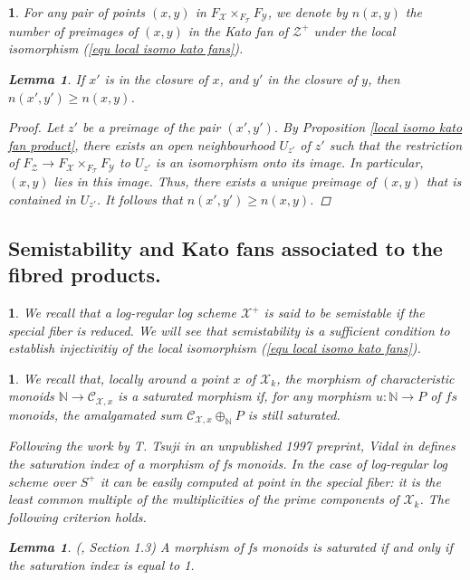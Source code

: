 \documentclass{amsart}%
\numberwithin{equation}{subsection}
\theoremstyle{plain2}
\newtheorem{lemma}[equation]{Lemma}
\theoremstyle{definition2}
\theoremstyle{stepstyle}
\theoremstyle{point}
\theoremstyle{subpoint}
\newtheorem{subpoint}[equation]{}%
\newcommand{\spa}[1]{\begin{subpoint}#1\end{subpoint}}           %
\newcommand{\N}{\ensuremath{\mathbb{N}}}
\newcommand{\cX}{\ensuremath{\mathscr{X}}}
\newcommand{\caC}{\ensuremath{\mathcal{C}}}
\newcommand{\cY}{\ensuremath{\mathscr{Y}}}
\newcommand{\cZ}{\ensuremath{\mathscr{Z}}}
\renewcommand{\cY}{\ensuremath{\mathscr{Y}}}
\begin{document}
\spa{For any pair of points $(x,y)$ in $F_\cX \times_{F_{\mathscr{T}}} F_\cY$, we denote by $n(x,y)$ the number of preimages of $(x,y)$ in the Kato fan of $\cZ^+$ under the local isomorphism (\ref{equ local isomo kato fans}).
\begin{lemma} \label{lemma number of preimages} If $x'$ is in the closure of $x$, and $y'$ in the closure of $y$, then $n(x',y')\geqslant n(x,y)$.
\end{lemma}
\begin{proof}
Let $z'$ be a preimage of the pair $(x',y')$. By Proposition \ref{local isomo kato fan product}, there exists an open neighbourhood $U_{z'}$ of $z'$ such that the restriction of $F_{\cZ} \rightarrow F_{\cX} \times_{F_\mathscr{T}} F_{\cY}$ to $U_{z'}$ is an isomorphism onto its image. In particular, $(x,y)$ lies in this image. Thus, there exists a unique preimage of $(x,y)$ that is contained in $U_{z'}$. It follows that $n(x',y')\geqslant n(x,y)$.
\end{proof}
}

\subsection{Semistability and Kato fans associated to the fibred products.} 
\spa{We recall that a log-regular log scheme $\cX^+$ is said to be semistable if the special fiber is reduced. We will see that semistability is a sufficient condition to establish injectivitiy of the local isomorphism (\ref{equ local isomo kato fans}). }

\spa{We recall that, locally around a point $x$ of $\cX_k$, the morphism of characteristic monoids $\N \rightarrow \caC_{\cX,x}$ is a saturated morphism if, for any morphism $u: \N \rightarrow P$ of $fs$ monoids, the amalgamated sum $\caC_{\cX,x} \oplus_{\N} P$ is still saturated.

Following the work by T. Tsuji in an unpublished 1997 preprint, Vidal in \cite{Vidal} defines the saturation index of a morphism of \emph{fs} monoids. In the case of log-regular log scheme over $S^+$ it can be easily computed at point in the special fiber: it is the least common multiple of the multiplicities of the prime components of $\cX_k$. The following criterion holds.
\begin{lemma} \label{lemma criterion saturation}(\cite{Vidal}, Section 1.3)
A morphism of fs monoids is saturated if and only if the saturation index is equal to 1.
\end{lemma}
}
\end{document}
